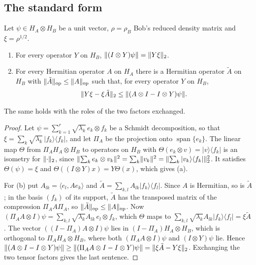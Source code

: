 \subsection{The standard form}

\begin{lemma}\label{lem:standard-form}
Let $\psi\in H_A\otimes H_B$ be a unit vector, $\rho=\rho_B$ Bob's reduced density matrix and $\xi=\rho^{1/2}$.
\begin{enumerate}[label=(\alph*),itemsep=1pt]
\item For every operator $Y$ on $H_B$, $\lVert (I\otimes Y)\psi\rVert=\lVert Y\xi\rVert_2$.
\item For every Hermitian operator $A$ on $H_A$ there is a Hermitian operator $\tilde A$ on $H_B$ with $\lVert \tilde A\rVert_{\mathrm{op}}\le\lVert A\rVert_{\mathrm{op}}$ such that,
for every operator $Y$ on $H_B$,
\[
\lVert Y\xi-\xi\tilde A\rVert_2\le\lVert (A\otimes I-I\otimes Y)\psi\rVert.
\]
\end{enumerate}
The same holds with the roles of the two factors exchanged.
\end{lemma}

\begin{proof}
Let $\psi=\sum_{k=1}^r\sqrt{\lambda_k}\,e_k\otimes f_k$ be a Schmidt decomposition, so that $\xi=\sum_k\sqrt{\lambda_k}\,|f_k\rangle\langle f_k|$,
and let $\Pi_A$ be the projection onto $\operatorname{span}\{e_k\}$. The linear map $\Theta$ from $\Pi_AH_A\otimes H_B$ to operators on $H_B$
with $\Theta(e_k\otimes v)=|v\rangle\langle f_k|$ is an isometry for $\lVert \cdot\rVert_2$, since
$\lVert \sum_ke_k\otimes v_k\rVert^2=\sum_k\lVert v_k\rVert^2=\lVert \sum_k|v_k\rangle\langle f_k|\rVert_2^2$. It satisfies $\Theta(\psi)=\xi$ and
$\Theta((I\otimes Y)x)=Y\Theta(x)$, which gives (a).

For (b) put $A_{lk}=\langle e_l,Ae_k\rangle$ and $\tilde A=\sum_{k,l}A_{lk}|f_k\rangle\langle f_l|$. Since $A$ is Hermitian, so is $\tilde A$;
in the basis $(f_k)$ of its support, $\tilde A$ has the transposed matrix of the compression $\Pi_AA\Pi_A$, so $\lVert \tilde A\rVert_{\mathrm{op}}\le\lVert A\rVert_{\mathrm{op}}$.
Now $(\Pi_AA\otimes I)\psi=\sum_{k,l}\sqrt{\lambda_k}A_{lk}\,e_l\otimes f_k$, which $\Theta$ maps to
$\sum_{k,l}\sqrt{\lambda_k}A_{lk}|f_k\rangle\langle f_l|=\xi\tilde A$. The vector $((I-\Pi_A)A\otimes I)\psi$ lies in
$(I-\Pi_A)H_A\otimes H_B$, which is orthogonal to $\Pi_AH_A\otimes H_B$, where both $(\Pi_AA\otimes I)\psi$ and $(I\otimes Y)\psi$ lie. Hence
$\lVert (A\otimes I-I\otimes Y)\psi\rVert\ge\lVert (\Pi_AA\otimes I-I\otimes Y)\psi\rVert=\lVert \xi\tilde A-Y\xi\rVert_2$. Exchanging the two tensor factors
gives the last sentence.
\end{proof}

